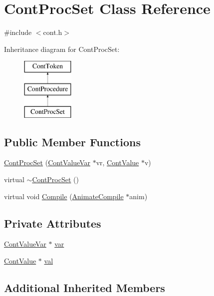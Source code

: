 \hypertarget{a00082}{\section{Cont\-Proc\-Set Class Reference}
\label{a00082}
}


{\ttfamily \#include $<$cont.\-h$>$}

Inheritance diagram for Cont\-Proc\-Set\-:\begin{figure}[H]
\begin{center}
\leavevmode
\includegraphics[height=3.000000cm]{a00082}
\end{center}
\end{figure}
\subsection*{Public Member Functions}
\begin{DoxyCompactItemize}
\item 
\hyperlink{a00082_a220eb729a1de8025671aa6133635b6d3}{Cont\-Proc\-Set} (\hyperlink{a00095}{Cont\-Value\-Var} $\ast$vr, \hyperlink{a00086}{Cont\-Value} $\ast$v)
\item 
virtual \hyperlink{a00082_adda9da47e39fe5df28d632702d2ca1b2}{$\sim$\-Cont\-Proc\-Set} ()
\item 
virtual void \hyperlink{a00082_a71bb8997d0068880ce828354ad0c8502}{Compile} (\hyperlink{a00007}{Animate\-Compile} $\ast$anim)
\end{DoxyCompactItemize}
\subsection*{Private Attributes}
\begin{DoxyCompactItemize}
\item 
\hyperlink{a00095}{Cont\-Value\-Var} $\ast$ \hyperlink{a00082_a8739b6b42f2a36329c2224eeab49ac1d}{var}
\item 
\hyperlink{a00086}{Cont\-Value} $\ast$ \hyperlink{a00082_ab9e6e43f981128702808311a96c0c195}{val}
\end{DoxyCompactItemize}
\subsection*{Additional Inherited Members}


